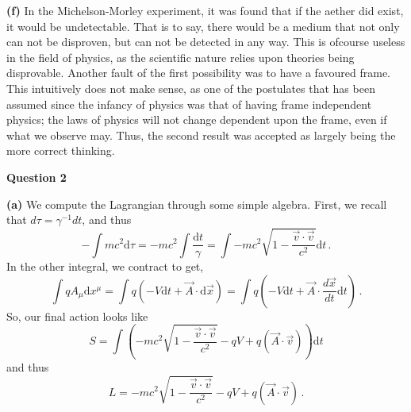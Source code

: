\documentclass[10pt]{article}
\newcommand{\dif}{\text{d}}
\newcommand{\del}[2][]{\frac{d #1}{d #2}}
\begin{document}
\textbf{(f)} In the Michelson-Morley experiment, it was found that if the aether did exist, it would be undetectable. That is to say, there would be a medium that not only can not be disproven, but can not be detected in any way. This is ofcourse useless in the field of physics, as the scientific nature relies upon theories being disprovable. Another fault of the first possibility was to have a favoured frame. This intuitively does not make sense, as one of the postulates that has been assumed since the infancy of physics was that of having frame independent physics; the laws of physics will not change dependent upon the frame, even if what we observe may. Thus, the second result was accepted as largely being the more correct thinking.

\newpage
\textbf{Question 2}

\textbf{(a)} We compute the Lagrangian through some simple algebra. First, we recall that $d\tau = \gamma^{-1}dt$, and thus
\[ -\int mc^{2}\dif\tau = -mc^{2}\int \frac{\dif t}{\gamma} = \int -mc^{2}\sqrt{1 - \frac{\vec{v}\cdot\vec{v}}{c^{2}}}\dif t\, .\]
In the other integral, we contract to get,
\[ \int qA_{\mu}\dif x^{\mu} = \int q (-V\dif t + \vec{A}\cdot \dif\vec{x}) = \int q\left(-V\dif t + \vec{A}\cdot \del[\vec{x}]{t}\dif t\right)\, . \]
So, our final action looks like
\[ S = \int \left (-mc^{2}\sqrt{1 - \frac{\vec{v}\cdot\vec{v}}{c^{2}}} - qV + q(\vec{A}\cdot \vec{v})\right )\dif t\]
and thus
\[ L = -mc^{2}\sqrt{1 - \frac{\vec{v}\cdot\vec{v}}{c^{2}}} - qV + q(\vec{A}\cdot \vec{v}) \, .\]
\end{document}
